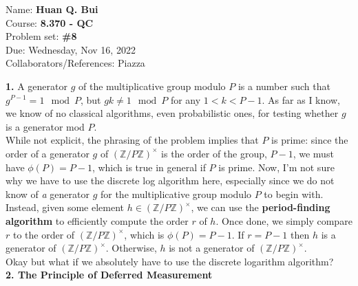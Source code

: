 \documentclass{article}
\theoremstyle{definition}
\begin{document}
\begin{framed}
\noindent Name: \textbf{Huan Q. Bui}\\
Course: \textbf{8.370 - QC}\\
Problem set: \textbf{\#8}\\
Due: Wednesday, Nov 16, 2022\\
Collaborators/References: Piazza
\end{framed}



\noindent \textbf{1. }  A generator $g$ of the multiplicative group modulo $P$ is a number such that $g^{P -1} =
1 \mod P$, but $gk \neq 1 \mod P$ for any $1 < k < P -1$. As far as I know, we
	know of no classical algorithms, even probabilistic ones, for testing whether $g$ is
	a generator mod $P$.\\

\noindent While not explicit, the phrasing of the problem implies that $P$ is prime: since the order of a generator $g$ of $(\mathbb{Z}/P\mathbb{Z})^\times$ is the order of the group, $P-1$, we must have $\phi(P) = P-1$, which is true in general if $P$ is prime. Now, I'm not sure why we have to use the discrete log algorithm here, especially since we do not know of \textit{a} generator $g$ for the multiplicative group modulo $P$  to begin with. Instead, given some element $h\in (\mathbb{Z}/P\mathbb{Z})^\times$, we can use the \textbf{period-finding algorithm} to efficiently compute the order $r$ of $h$. Once done, we simply compare $r$ to the order of  $(\mathbb{Z}/P\mathbb{Z})^\times$, which is $\phi(P) = P-1$. If $r = P-1$ then $h$ is a generator of $(\mathbb{Z}/P\mathbb{Z})^\times$. Otherwise, $h$ is not a generator of  $(\mathbb{Z}/P\mathbb{Z})^\times$.\\

\noindent Okay but what if we absolutely have to use the discrete logarithm algorithm? \\

\noindent \textbf{2. The Principle of Deferred Measurement} \\
\end{document}

